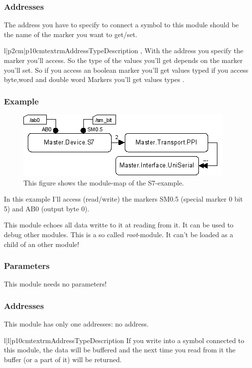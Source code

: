 \subsubsection{Addresses}
The address you have to specify to connect a symbol to this module should be 
the name of the marker you want to get/set.
\begin{tableiii}{l|p{2cm}|p{10cm}}{textrm}{Address}{Type}{Description}
        {, }
        {With the address you specify the marker you'll access. So the type 
         of the values you'll get depends on the marker you'll set. So if you 
         access an boolean marker you'll get values typed  if you
         access byte,word and double word Markers you'll get values types
         .}
\end{tableiii}

\subsubsection{Example}
\begin{figure}[ht]
    \label{fig:coremod08}
    \centering
    \includegraphics{coremod08.png}
    \caption{This figure shows the module-map of the S7-example.}
\end{figure}    
In this example I'll access (read/write) the markers SM0.5 (special marker 0 bit 5) and AB0
(output byte 0).





%
%
This module echoes all data writte to it at reading from it. It can be used to
debug other modules. This is a so called \emph{root}-module. It can't be 
loaded as a child of an other module!

\subsubsection{Parameters}
This module needs no parameters!

\subsubsection{Addresses}
This module has only one addresses: no address.
\begin{tableiii}{l|l|p{10cm}}{textrm}{Address}{Type}{Description}
\lineiii{---}
        {}
        {If you write into a symbol connected to this module, the data will be
         buffered and the next time you read from it the buffer (or a part of 
         it) will be returned.}
\end{tableiii}

